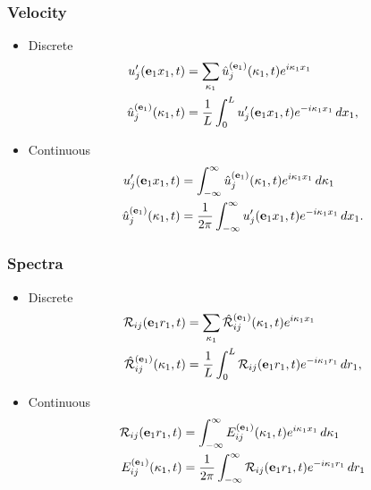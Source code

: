 \documentclass[oneside,a4paper,11pt]{report}
\newcommand{\ufluc}{u'}
\newcommand{\tpvc}{\mathcal{R}} %
\newcommand{\est}{E}            %
\begin{document}
\subsubsection{Velocity}
\begin{itemize}
\item Discrete
\begin{align}
\ufluc_j(\evec_1 x_1,t) &= \sum_{\kappa_1} \hat{u}^{(\evec_1)}_j(\kappa_1,t) e^{i \kappa_1 x_1}\\
\hat{u}^{(\evec_1)}_j(\kappa_1,t) &= \frac{1}{L} \int_0^L \ufluc_j(\evec_1 x_1,t) e^{-i \kappa_1 x_1} \, dx_1,
\end{align}
\item Continuous
\begin{align}
\ufluc_j(\evec_1 x_1,t) &= \int_{-\infty}^{\infty} \hat{u}^{(\evec_1)}_j(\kappa_1,t) e^{i \kappa_1 x_1} \, d\kappa_1 \\
\hat{u}^{(\evec_1)}_j(\kappa_1,t) &= \frac{1}{2\pi} \int_{-\infty}^{\infty} \ufluc_j(\evec_1 x_1,t) e^{-i \kappa_1 x_1} \, dx_1.
\end{align}
\end{itemize}

\subsubsection{Spectra}
\begin{itemize}
\item Discrete
\begin{align}
\tpvc_{ij}(\evec_1 r_1, t) &= \sum_{\kappa_1} \hat{\tpvc}_{ij}^{(\evec_1)}(\kappa_1,t) e^{i \kappa_1 x_1} \\
\hat{\tpvc}_{ij}^{(\evec_1)}(\kappa_1,t) &= \frac{1}{L} \int_0^L \tpvc_{ij} (\evec_1 r_1, t) e^{-i\kappa_1 r_1} \, dr_1,
\end{align}
\item Continuous
\begin{align}
\tpvc_{ij}(\evec_1 r_1, t) &= \int_{-\infty}^{\infty} \est_{ij}^{(\evec_1)}(\kappa_1,t) e^{i \kappa_1 x_1} \, d\kappa_1 \\
\est_{ij}^{(\evec_1)}(\kappa_1,t) &=  \frac{1}{2 \pi} \int_{-\infty}^{\infty} \tpvc_{ij}(\evec_1 r_1,t) e^{-i \kappa_1 r_1} \, d r_1
\end{align}
\end{itemize}
\end{document}
